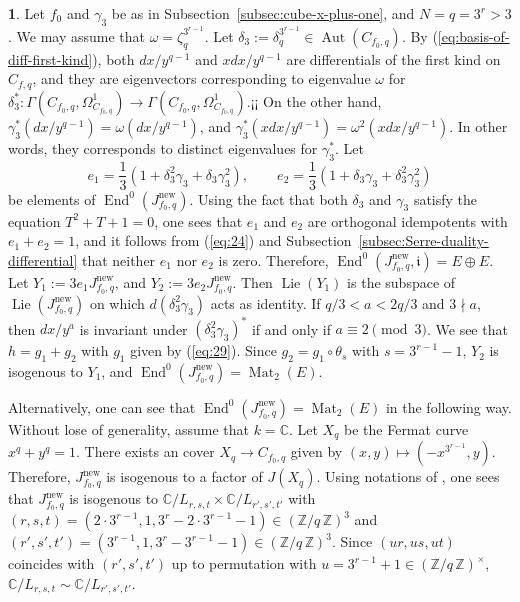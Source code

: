 \documentclass{amsart}[11pt]
\theoremstyle{definition}
\newtheorem{sect}[thm]{}
\numberwithin{equation}{section}
\theoremstyle{notitle}
\begin{document}
 \begin{sect}
   Let $f_0$ and $\gamma_3$ be as in
   Subsection~\ref{subsec:cube-x-plus-one}, and $N=q=3^r>3$. We may
   assume that $\omega=\zeta_q^{3^{r-1}}$.  Let $\delta_3:=
   \delta_q^{3^{r-1}}\in \operatorname{Aut}(C_{f_0,q})$.  By
   (\ref{eq:basis-of-diff-first-kind}), both $dx/y^{q-1}$ and
   $xdx/y^{q-1}$ are differentials of the first kind on $C_{f,q}$, and
   they are eigenvectors corresponding to eigenvalue $\omega$ for
   $\delta_3^*: \Gamma(C_{f_0, q}, \Omega_{C_{f_0,q}}^1)\to
   \Gamma(C_{f_0, q}, \Omega_{C_{f_0,q}}^1)$.¡¡ On the other hand,
   $\gamma_3^* (dx/y^{q-1})= \omega (dx/y^{q-1})$, and $\gamma_3^*
   (xdx/y^{q-1})= \omega^2 (xdx/y^{q-1})$.  In other words, they
   corresponds to distinct eigenvalues for $\gamma_3^*$.  Let
   \[ e_1= \frac{1}{3}(1+\delta_3^2\gamma_3+\delta_3\gamma_3^2),
   \qquad e_2= \frac{1}{3}(1+ \delta_3\gamma_3+
   \delta_3^2\gamma_3^2) \] be elements of $\operatorname{End}^0(J_{f_0,
     q}^{\mathrm{new}})$. Using the fact that both $\delta_3$ and $\gamma_3$
   satisfy the equation $T^2+T+1=0$, one sees that $e_1$ and $e_2$
   are orthogonal idempotents with $e_1+e_2=1$, and it follows from
   (\ref{eq:24}) and
   Subsection~\ref{subsec:Serre-duality-differential} that neither
   $e_1$ nor $e_2$ is zero. Therefore, $\operatorname{End}^0(J_{f_0, q}^{\mathrm{new}},
   {\mathfrak{i}})=E\oplus E$.  Let $Y_1:= 3e_1 J_{f_0, q}^{\mathrm{new}}$, and $Y_2:= 3e_2
   J_{f_0, q}^{\mathrm{new}}$. Then $\operatorname{Lie}(Y_1)$ is the subspace of
   $\operatorname{Lie}(J_{f_0,q}^{\mathrm{new}})$ on which $d(\delta_3^2\gamma_3)$ acts as
   identity.  If $q/3<a<2q/3$ and $3\nmid a$, then $dx/y^a$ is
   invariant under $(\delta_3^2\gamma_3)^*$ if and only if $a\equiv
   2\pmod{3}$.  We see that $h=g_1+g_2$ with $g_1$ given by
   (\ref{eq:29}). Since $g_2=g_1\circ \theta_s$ with $s=3^{r-1}-1$,
   $Y_2$ is isogenous to $Y_1$, and $\operatorname{End}^0(J_{f_0,
     q}^{\mathrm{new}})=\operatorname{Mat}_2(E)$.

   Alternatively, one can see that $\operatorname{End}^0(J_{f_0, q}^{\mathrm{new}})=\operatorname{Mat}_2(E)$
   in the following way. Without lose of generality, assume that
   $k={\mathbb{C}}$. Let $X_q$ be the Fermat curve $x^q+y^q=1$. There exists an
   cover $X_q\to C_{f_0,q}$ given by $(x,y)\mapsto (-x^{3^{r-1}},
   y)$. Therefore, $J_{f_0, q}^{\mathrm{new}}$ is isogenous to a factor of
   $J(X_q)$. Using notations of \cite{MR511556}, one sees that
   $J_{f_0, q}^{\mathrm{new}}$ is isogenous to ${\mathbb{C}}/L_{r,s,t}\times
   {\mathbb{C}}/L_{r',s',t'}$ with $(r, s, t)=(2\cdot 3^{r-1}, 1, 3^r- 2\cdot
   3^{r-1}-1)\in ({\mathbb{Z}/ {q}\, \mathbb{Z}})^3$ and $(r', s', t')=( 3^{r-1}, 1, 3^r-
   3^{r-1}-1)\in ({\mathbb{Z}/ {q}\, \mathbb{Z}})^3$.  Since $(ur,us,ut)$ coincides with
   $(r', s',t')$ up to permutation with $u=3^{r-1}+1\in {(\mathbb{Z}/ {q}\, \mathbb{Z})^\times}$,
   ${\mathbb{C}}/L_{r,s,t} \sim {\mathbb{C}}/L_{r',s',t'}$.
 \end{sect}
\end{document}
